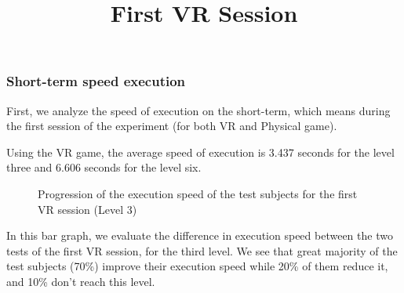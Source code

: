 \documentclass[12pt, openany, twocolumn]{article}
\begin{document}
        \subsubsection{Short-term speed execution}
        First, we analyze the speed of execution on the short-term, which means during the first session of the experiment (for both VR and Physical game).
        \\

            \noindent \title{\textbf{First VR Session}} \vspace{0.25cm}
            
            Using the VR game, the average speed of execution is 3.437 seconds for the level three and 6.606 seconds for the level six.

                \begin{figure}[H]
                    \setlength{\fboxsep}{0pt}
                    \setlength{\fboxrule}{1pt}
                    \caption{Progression of the execution speed of the test subjects for the first VR session (Level 3)}
                \end{figure}

            In this bar graph, we evaluate the difference in execution speed between the two tests of the first VR session, for the third level. 
            We see that great majority of the test subjects (70\%) improve their execution speed while 20\% of them reduce it, and 10\% don't reach this level.
            \\
\end{document}
